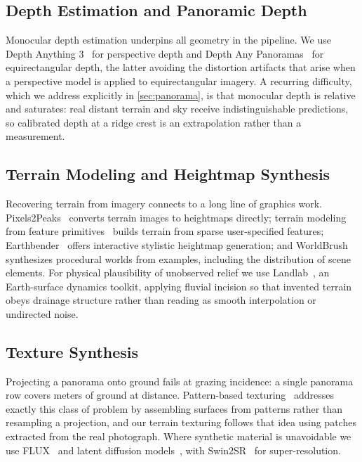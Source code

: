 \subsection{Depth Estimation and Panoramic Depth}

Monocular depth estimation underpins all geometry in the pipeline. We use
Depth Anything 3~\cite{lin2025depth3recoveringvisual} for perspective depth and
Depth Any Panoramas~\cite{lin2025dap} for equirectangular depth, the latter
avoiding the distortion artifacts that arise when a perspective model is applied
to equirectangular imagery. A recurring difficulty, which we address explicitly
in \cref{sec:panorama}, is that monocular depth is relative and saturates: real
distant terrain and sky receive indistinguishable predictions, so calibrated depth
at a ridge crest is an extrapolation rather than a measurement.

\subsection{Terrain Modeling and Heightmap Synthesis}

Recovering terrain from imagery connects to a long line of graphics work.
Pixels2Peaks~\cite{jain:hal-05617061} converts terrain images to heightmaps
directly; terrain modeling from feature primitives~\cite{genevaux:hal-01257198}
builds terrain from sparse user-specified features;
Earthbender~\cite{10.1145/3769047.3769053} offers interactive stylistic heightmap
generation; and WorldBrush~\cite{10.1145/2766975} synthesizes procedural worlds
from examples, including the distribution of scene elements. For physical
plausibility of unobserved relief we use
Landlab~\cite{barnhart2020landlab,hobley2017creative,Hutton_landlab_2020}, an
Earth-surface dynamics toolkit, applying fluvial incision so that invented terrain
obeys drainage structure rather than reading as smooth interpolation or undirected
noise.

\subsection{Texture Synthesis}

Projecting a panorama onto ground fails at grazing incidence: a single panorama
row covers meters of ground at distance. Pattern-based
texturing~\cite{neyret:inria-00537511} addresses exactly this class of problem by
assembling surfaces from patterns rather than resampling a projection, and our
terrain texturing follows that idea using patches extracted from the real
photograph. Where synthetic material is unavoidable we use
FLUX~\cite{esser2024scalingrectifiedflowtransformers} and latent diffusion
models~\cite{Rombach_2022_CVPR}, with
Swin2SR~\cite{conde2022swin2srswinv2transformercompressed} for super-resolution.

